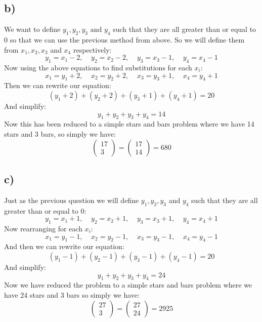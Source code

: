 \documentclass{article}
\begin{document}
\subsection*{b)}
We want to define $y_{1},y_{2},y_{3} \text{ and } y_{4}$ such that they are all greater than or equal to 0 so that we can use the previous method from above. So we will define them from $x_{1},x_{2},x_{3}$ and $x_{4}$ respectively: $$y_{1}=x_{1}-2,\;\;\;\;y_{2}=x_{2}-2,\;\;\;\;y_{3}=x_{3}-1,\;\;\;\;y_{4}=x_{4}-1$$
Now using the above equations to find substitutions for each $x_{i}$: $$x_{1}=y_{1}+2,\;\;\;\;x_{2}=y_{2}+2,\;\;\;\;x_{3}=y_{3}+1,\;\;\;\;x_{4}=y_{4}+1$$
Then we can rewrite our equation: $$(y_{1}+2)+(y_{2}+2)+(y_{3}+1)+(y_{4}+1)=20$$
And simplify: $$y_{1}+y_{2}+y_{3}+y_{4}=14$$
Now this has been reduced to a simple stars and bars problem where we have 14 stars and 3 bars, so simply we have: $$\begin{pmatrix}
    17\\3
\end{pmatrix}=\begin{pmatrix}
    17\\14
\end{pmatrix}=\boxed{680}$$

\subsection*{c)}
Just as the previous question we will define $y_{1},y_{2},y_{3}$ and $y_{4}$ such that they are all greater than or equal to 0: $$y_{1}=x_{1}+1,\;\;\;\;y_{2}=x_{2}+1,\;\;\;\;y_{3}=x_{3}+1,\;\;\;\;y_{4}=x_{4}+1$$
Now rearranging for each $x_{i}$: $$x_{1}=y_{1}-1,\;\;\;\;x_{2}=y_{2}-1,\;\;\;\;x_{3}=y_{3}-1,\;\;\;\;x_{4}=y_{4}-1$$
And then we can rewrite our equation: 
$$(y_{1}-1)+(y_{2}-1)+(y_{3}-1)+(y_{4}-1)=20$$
And simplify: 
$$y_{1}+y_{2}+y_{3}+y_{4}=24$$
Now we have reduced the problem to a simple stars and bars problem where we have 24 stars and 3 bars so simply we have: $$\begin{pmatrix}
    27\\3
\end{pmatrix}=\begin{pmatrix}
    27\\24
\end{pmatrix}=\boxed{2925}$$
\end{document}
